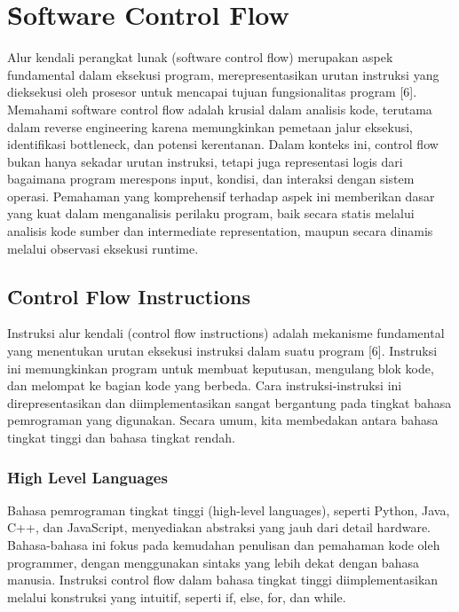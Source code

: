 \section{\f{Software Control Flow}}
Alur kendali perangkat lunak (software control flow) merupakan aspek fundamental dalam eksekusi program, merepresentasikan urutan instruksi yang dieksekusi oleh prosesor untuk mencapai tujuan fungsionalitas program [6]. Memahami  software control flow adalah krusial dalam analisis kode, terutama dalam reverse engineering karena memungkinkan pemetaan jalur eksekusi, identifikasi bottleneck, dan potensi kerentanan. Dalam konteks ini, control flow bukan hanya sekadar urutan instruksi, tetapi juga representasi logis dari bagaimana program merespons input, kondisi, dan interaksi dengan sistem operasi. Pemahaman yang komprehensif terhadap aspek ini memberikan dasar yang kuat dalam menganalisis perilaku program, baik secara statis melalui analisis kode sumber dan intermediate representation, maupun secara dinamis melalui observasi eksekusi runtime.

\subsection{\f{Control Flow Instructions}}
Instruksi alur kendali (control flow instructions) adalah mekanisme fundamental yang menentukan urutan eksekusi instruksi dalam suatu program [6]. Instruksi ini memungkinkan program untuk membuat keputusan, mengulang blok kode, dan melompat ke bagian kode yang berbeda. Cara instruksi-instruksi ini direpresentasikan dan diimplementasikan sangat bergantung pada tingkat bahasa pemrograman yang digunakan. Secara umum, kita membedakan antara bahasa tingkat tinggi dan bahasa tingkat rendah.

\subsubsection{\f{High Level Languages}}
Bahasa pemrograman tingkat tinggi (high-level languages), seperti Python, Java, C++, dan JavaScript, menyediakan abstraksi yang jauh dari detail hardware. Bahasa-bahasa ini fokus pada kemudahan penulisan dan pemahaman kode oleh programmer, dengan menggunakan sintaks yang lebih dekat dengan bahasa manusia. Instruksi control flow dalam bahasa tingkat tinggi diimplementasikan melalui konstruksi yang intuitif, seperti if, else, for, dan while.

